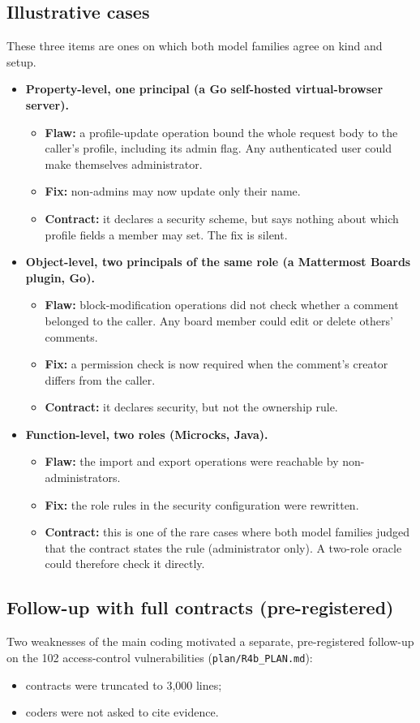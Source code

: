 \documentclass[conference]{IEEEtran}
\begin{document}
\subsection{Illustrative cases}
These three items are ones on which both model families agree on kind and setup.
\begin{itemize}
\item \textbf{Property-level, one principal (a Go self-hosted virtual-browser server).}
\begin{itemize}
\item \textbf{Flaw:} a profile-update operation bound the whole request body to the caller's profile, including its admin flag. Any authenticated user could make themselves administrator.
\item \textbf{Fix:} non-admins may now update only their name.
\item \textbf{Contract:} it declares a security scheme, but says nothing about which profile fields a member may set. The fix is silent.
\end{itemize}
\item \textbf{Object-level, two principals of the same role (a Mattermost Boards plugin, Go).}
\begin{itemize}
\item \textbf{Flaw:} block-modification operations did not check whether a comment belonged to the caller. Any board member could edit or delete others' comments.
\item \textbf{Fix:} a permission check is now required when the comment's creator differs from the caller.
\item \textbf{Contract:} it declares security, but not the ownership rule.
\end{itemize}
\item \textbf{Function-level, two roles (Microcks, Java).}
\begin{itemize}
\item \textbf{Flaw:} the import and export operations were reachable by non-administrators.
\item \textbf{Fix:} the role rules in the security configuration were rewritten.
\item \textbf{Contract:} this is one of the rare cases where both model families judged that the contract states the rule (administrator only). A two-role oracle could therefore check it directly.
\end{itemize}
\end{itemize}

\subsection{Follow-up with full contracts (pre-registered)}
Two weaknesses of the main coding motivated a separate, pre-registered follow-up on the 102 access-control vulnerabilities (\texttt{plan/\allowbreak{}R4b\_PLAN.md}):
\begin{itemize}
\item contracts were truncated to 3,000 lines;
\item coders were not asked to cite evidence.
\end{itemize}
\end{document}
